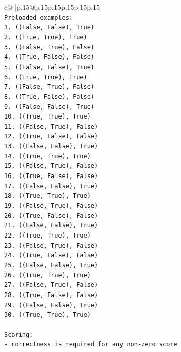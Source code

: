 \documentclass{article}
\begin{document}
{\begin{supertabular}{c@{$\;$}|p{.15\linewidth}@{}p{.15\linewidth}p{.15\linewidth}p{.15\linewidth}p{.15\linewidth}p{.15\linewidth}}
{{{\\ 
\texttt{Preloaded examples:} \\
\texttt{1. ((False, False), True)} \\
\texttt{2. ((True, True), True)} \\
\texttt{3. ((False, True), False)} \\
\texttt{4. ((True, False), False)} \\
\texttt{5. ((False, False), True)} \\
\texttt{6. ((True, True), True)} \\
\texttt{7. ((False, True), False)} \\
\texttt{8. ((True, False), False)} \\
\texttt{9. ((False, False), True)} \\
\texttt{10. ((True, True), True)} \\
\texttt{11. ((False, True), False)} \\
\texttt{12. ((True, False), False)} \\
\texttt{13. ((False, False), True)} \\
\texttt{14. ((True, True), True)} \\
\texttt{15. ((False, True), False)} \\
\texttt{16. ((True, False), False)} \\
\texttt{17. ((False, False), True)} \\
\texttt{18. ((True, True), True)} \\
\texttt{19. ((False, True), False)} \\
\texttt{20. ((True, False), False)} \\
\texttt{21. ((False, False), True)} \\
\texttt{22. ((True, True), True)} \\
\texttt{23. ((False, True), False)} \\
\texttt{24. ((True, False), False)} \\
\texttt{25. ((False, False), True)} \\
\texttt{26. ((True, True), True)} \\
\texttt{27. ((False, True), False)} \\
\texttt{28. ((True, False), False)} \\
\texttt{29. ((False, False), True)} \\
\texttt{30. ((True, True), True)} \\
\\ 
\texttt{Scoring:} \\
\texttt{{-} correctness is required for any non{-}zero score} \\
}}}
\end{supertabular}}
\end{document}
